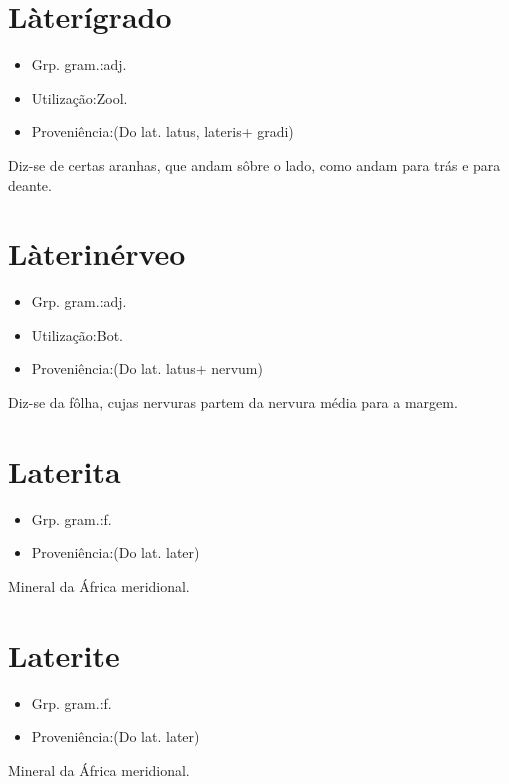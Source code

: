\section{Làterígrado}
\begin{itemize}
\item {Grp. gram.:adj.}
\end{itemize}
\begin{itemize}
\item {Utilização:Zool.}
\end{itemize}
\begin{itemize}
\item {Proveniência:(Do lat. \textunderscore latus\textunderscore , \textunderscore lateris\textunderscore  + \textunderscore gradi\textunderscore )}
\end{itemize}
Diz-se de certas aranhas, que andam sôbre o lado, como andam para trás e para deante.
\section{Làterinérveo}
\begin{itemize}
\item {Grp. gram.:adj.}
\end{itemize}
\begin{itemize}
\item {Utilização:Bot.}
\end{itemize}
\begin{itemize}
\item {Proveniência:(Do lat. \textunderscore latus\textunderscore  + \textunderscore nervum\textunderscore )}
\end{itemize}
Diz-se da fôlha, cujas nervuras partem da nervura média para a margem.
\section{Laterita}
\begin{itemize}
\item {Grp. gram.:f.}
\end{itemize}
\begin{itemize}
\item {Proveniência:(Do lat. \textunderscore later\textunderscore )}
\end{itemize}
Mineral da África meridional.
\section{Laterite}
\begin{itemize}
\item {Grp. gram.:f.}
\end{itemize}
\begin{itemize}
\item {Proveniência:(Do lat. \textunderscore later\textunderscore )}
\end{itemize}
Mineral da África meridional.

